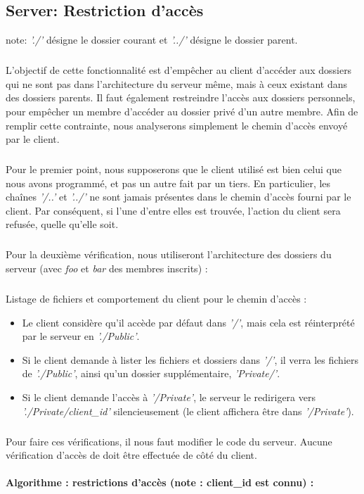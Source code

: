 \documentclass[12pt,a4paper,twoside]{article}
\begin{document}
		\subsection{Server: Restriction d'accès} %
			note: \textit{'./'} désigne le dossier courant et \textit{'../'} désigne le dossier parent.
			\subparagraph*{}
				L'objectif de cette fonctionnalité est d'empêcher au client d'accéder aux dossiers qui ne sont pas dans l'architecture du serveur même, mais à ceux existant dans des dossiers parents. Il faut également restreindre l'accès aux dossiers personnels, pour empêcher un membre d'accéder au dossier privé d'un autre membre.
				Afin de remplir cette contrainte, nous analyserons simplement le chemin d'accès envoyé par le client.
			\subparagraph*{}
				Pour le premier point, nous supposerons que le client utilisé est bien celui que nous avons programmé, et pas un autre fait par un tiers. En particulier, les chaînes \textit{'/..'} et \textit{'../'} ne sont jamais présentes dans le chemin d'accès fourni par le client. Par  conséquent, si l'une d'entre elles est trouvée, l'action du client sera refusée, quelle qu'elle soit.
			\subparagraph*{}
				Pour la deuxième vérification, nous utiliseront l'architecture des dossiers du serveur (avec \textit{foo} et \textit{bar} des membres inscrits) :
				\begin{samepage}
					
				\end{samepage}
			\subparagraph*{}
				Listage de fichiers et comportement du client pour le chemin d'accès :
				\begin{itemize}
					\item{} Le client considère qu'il accède par défaut dans \textit{'/'}, mais cela est réinterprété par le serveur en \textit{'./Public'}.
					\item{} Si le client demande à lister les fichiers et dossiers dans \textit{'/'}, il verra les fichiers de \textit{'./Public'}, ainsi qu'un dossier supplémentaire, \textit{'Private/'}.
					\item{} Si le client demande l'accès à \textit{'/Private'}, le serveur le redirigera vers \textit{'./Private/client\_id'} silencieusement (le client affichera être dans \textit{'/Private'}).
				 \end{itemize}
			\subparagraph*{}
				Pour faire ces vérifications, il nous faut modifier le code du serveur. Aucune vérification d'accès de doit être effectuée de côté du client.
				\paragraph*{Algorithme : restrictions d'accès (note : client\_id est connu) :}
				
				
\end{document}
